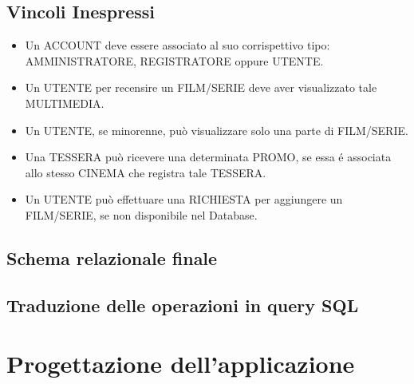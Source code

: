 \documentclass[a4paper,12pt]{report}
\begin{document}
\section{Vincoli Inespressi}
\begin{itemize}
	\item Un ACCOUNT deve essere associato al suo corrispettivo tipo: AMMINISTRATORE, REGISTRATORE oppure UTENTE.
	\item Un UTENTE per recensire un FILM/SERIE deve aver visualizzato tale MULTIMEDIA.
	\item Un UTENTE, se minorenne, può visualizzare solo una parte di FILM/SERIE.
	\item Una TESSERA può ricevere una determinata PROMO, se essa é associata allo stesso CINEMA che registra tale TESSERA.
	\item Un UTENTE può effettuare una RICHIESTA per aggiungere un FILM/SERIE, se non disponibile nel Database.
\end{itemize}

\section{Schema relazionale finale}
\section{Traduzione delle operazioni in query SQL}
\chapter{Progettazione dell'applicazione}
\end{document}
